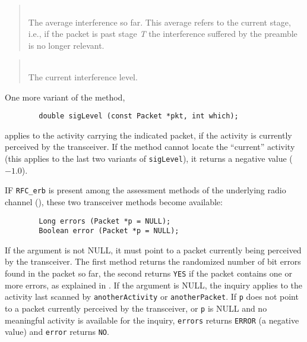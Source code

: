 \begin{quote}
\noindent{}\\ \hspace{0in}
The average interference so far.
This average refers to the current stage, i.e.,
if the packet is past stage {\em T\/} the interference suffered
by the preamble is no longer relevant.
\end{quote}

\begin{quote}
\noindent{}\\ \hspace{0in}
The current interference level.
\end{quote}

One more variant of the method,
\begin{verbatim}
        double sigLevel (const Packet *pkt, int which);
\end{verbatim}
\noindent
applies to the activity carrying the indicated packet, if the activity is
currently perceived by the transceiver.
If the method cannot locate the ``current'' activity (this applies to the
last two variants of {\tt sigLevel}), it returns a negative value ($-1.0$).

IF {\tt RFC\_erb} is present among the assessment methods of the underlying
radio channel (), these two transceiver methods
become available:
\begin{verbatim}
        Long errors (Packet *p = NULL);
        Boolean error (Packet *p = NULL);
\end{verbatim}
If the argument is not NULL, it must point to a packet currently being
perceived by the transceiver.
The first method returns the randomized number of bit errors found in the
packet so far, the second returns {\tt YES} if the packet contains one or more
errors, as explained in .
If the argument is NULL, the inquiry applies to the activity last scanned by
{\tt anotherActivity} or {\tt anotherPacket}.
If {\tt p} does not point to a packet currently perceived by the transceiver,
or {\tt p} is NULL and no meaningful activity is available for the inquiry,
{\tt errors} returns {\tt ERROR} (a negative value) and {\tt error} returns
{\tt NO}.

